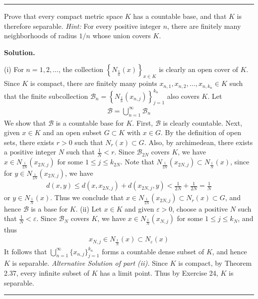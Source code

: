 \documentclass[12pt]{article}
\theoremstyle{definition}
\begin{document}
\bigskip\noindent\hrule\bigskip

Prove that every compact metric space $K$ has a countable base, and that $K$ is therefore separable. \textit{Hint:} For every positive integer $n$, there are finitely many neighborhoods of radius $1/n$ whose union covers $K$.

\smallskip
\noindent\textbf{Solution.}\quad

(i) For $n=1,2,\ldots$, the collection $\left\{N_{\tfrac{1}{n}}(x)\right\}_{x\in K}$ is clearly an open cover of $K$. Since $K$ is compact, there are finitely many points $x_{n,1},x_{n,2},\ldots,x_{n,k_n}\in K$ such that the finite subcollection $\mathcal{B}_n=\left\{N_{\tfrac{1}{n}}(x_{n,j})\right\}_{j=1}^{k_n}$ also covers $K$. Let 
\begin{align*}
\mathcal{B}
=\bigcup_{n=1}^\infty\mathcal{B}_n
\end{align*}
We show that $\mathcal{B}$ is a countable base for $K$. First, $\mathcal{B}$ is clearly countable. Next, given $x\in K$ and an open subset $G\subset K$ with $x\in G$. By the definition of open sets, there exists $r>0$ such that $N_r(x)\subset G$. Also, by archimedean, there exists a positive integer $N$ such that $\frac{1}{N}<r$. Since $\mathcal{B}_{2N}$ covers $K$, we have $x\in N_{\tfrac{1}{2N}}(x_{2N,j})$ for some $1\le j\le k_{2N}$. Note that $N_{\tfrac{1}{2N}}(x_{2N,j})\subset N_{\tfrac{1}{N}}(x)$, since for $y\in N_{\tfrac{1}{2N}}(x_{2N,j})$, we have
\begin{align*}
d(x,y)\le d(x,x_{2N,j})+d(x_{2N,j},y)<\frac{1}{2N}+\frac{1}{2N}=\frac{1}{N}
\end{align*}
or $y\in N_{\tfrac{1}{N}}(x)$. Thus we conclude that $x\in N_{\tfrac{1}{2N}}(x_{2N,j})\subset N_r(x)\subset G$, and hence $\mathcal{B}$ is a base for $K$.
(ii) Let $x\in K$ and given $\varepsilon>0$, choose a positive $N$ such that $\frac{1}{N}<\varepsilon$. Since $\mathcal{B}_{N}$ covers $K$, we have $x\in N_{\tfrac{1}{N}}(x_{N,j})$ for some $1\le j\le k_{N}$, and thus 
\begin{align*}
x_{N,j}\in  N_{\tfrac{1}{N}}(x)\subset N_\varepsilon(x)
\end{align*}
It follows that $\bigcup_{n=1}^\infty\{x_{n,j}\}_{j=1}^{k_n}$ forms a countable dense subset of $K$, and hence $K$ is separable.
\textit{Alternative Solution of part (ii).} Since $K$ is compact, by Theorem 2.37, every infinite subset of $K$ has a limit point. Thus by Exercise 24, $K$ is separable.



\bigskip\noindent\hrule\bigskip
\end{document}
